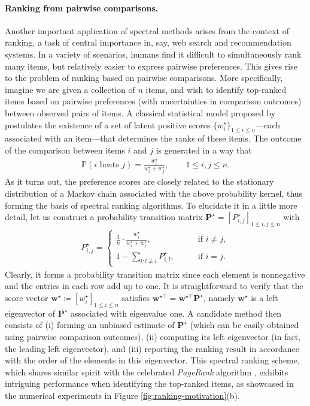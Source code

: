 \paragraph{Ranking from pairwise comparisons.}
Another important application of spectral methods arises from the context of ranking,  a task  of central importance in, say, web search and recommendation systems.
In a variety of scenarios, humans find it difficult to simultaneously rank many items, but relatively easier to express pairwise preferences.
This gives rise to the problem of ranking based on pairwise comparisons.
More specifically, imagine we are given a collection of $n$ items, and wish to identify top-ranked items based on pairwise preferences (with uncertainties in comparison outcomes) between observed pairs of items.
A classical statistical model proposed by \citet{bradley1952rank, luce2012individual} postulates the existence of a set of latent positive scores $\{w_i^{\star}\}_{1\leq i\leq n}$---each associated with an item---that determines the ranks of these items.
 The outcome of the comparison between items $i$ and $j$ is generated in a way that
 \begin{align*}
	 \mathbb{P}(i\text{ beats }j) = \frac{w_i^{\star}}{w_i^{\star}+w_j^{\star}}, \qquad 1\leq i,j\leq n.
\end{align*}
%
As it turns out, the preference scores  are closely related to the stationary distribution of a Markov chain associated with the above probability kernel,
thus forming the basis of spectral ranking algorithms.
To elucidate it in a little more detail, let us construct a probability transition matrix $\bm{P}^{\star}=[P_{i,j}^{\star}]_{1\leq i,j\leq n}$ with
%
\begin{align*}
	P_{i,j}^{\star}=\begin{cases}
\frac{1}{n}\cdot\frac{w_{j}^{\star}}{w_{i}^{\star}+w_{j}^{\star}}, & \text{if }i\neq j,\\
		1-\sum_{l:l\neq i}P_{i,l}^{\star}, \qquad & \text{if }i=j.
\end{cases}
\end{align*}
%
Clearly, it forms a probability transition matrix since each element is nonnegative and the entries in each row add up to one.
It is straightforward to verify that the score vector $\bm{w}^{\star}\coloneqq [w_i^{\star}]_{1\leq i\leq n}$ satisfies $\bm{w}^{\star\top} = \bm{w}^{\star\top} \bm{P}^{\star}$, namely $\bm{w}^{\star}$ is a left eigenvector of $\bm{P}^{\star}$ associated with eigenvalue one. A candidate  method then consists of (i) forming an unbiased estimate of $\bm{P}^{\star}$ (which can be easily obtained using pairwise comparison outcomes), (ii) computing its left eigenvector (in fact, the leading left eigenvector), and (iii) reporting the ranking result in accordance with the order of the elements in this eigenvector.
This spectral ranking scheme, which shares similar spirit with the celebrated {\em PageRank} algorithm \citep{page1999pagerank},
exhibits intriguing performance when identifying the top-ranked items, as showcased in the numerical experiments in Figure \ref{fig:ranking-motivation}(b).





